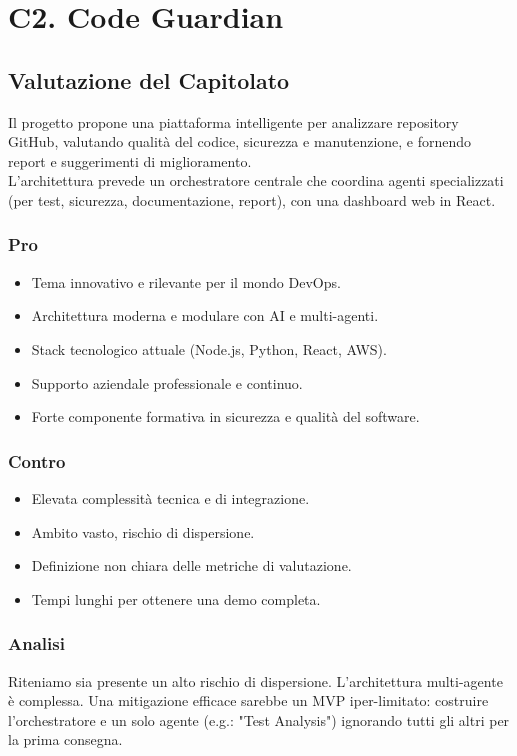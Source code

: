 \documentclass[a4paper, 11pt, oneside]{scrartcl} %
\begin{document}
\section{C2. Code Guardian}
\subsection*{Valutazione del Capitolato}
Il progetto propone una piattaforma intelligente per analizzare repository GitHub, valutando qualità del codice, sicurezza e manutenzione, e fornendo report e suggerimenti di miglioramento.\\
L’architettura prevede un orchestratore centrale che coordina agenti specializzati (per test, sicurezza, documentazione, report), con una dashboard web in React.

\subsubsection*{Pro}
\begin{itemize}
    \item Tema innovativo e rilevante per il mondo DevOps.
    \item Architettura moderna e modulare con AI e multi-agenti.
    \item Stack tecnologico attuale (Node.js, Python, React, AWS).
    \item Supporto aziendale professionale e continuo.
    \item Forte componente formativa in sicurezza e qualità del software.
\end{itemize}

\subsubsection*{Contro}
\begin{itemize}
    \item Elevata complessità tecnica e di integrazione.
    \item Ambito vasto, rischio di dispersione.
    \item Definizione non chiara delle metriche di valutazione.
    \item Tempi lunghi per ottenere una demo completa.
\end{itemize}
\subsubsection*{Analisi}
Riteniamo sia presente un alto rischio di dispersione. L'architettura multi-agente è complessa. Una mitigazione efficace sarebbe un MVP iper-limitato: costruire l'orchestratore e un solo agente (e.g.: "Test Analysis") ignorando tutti gli altri per la prima consegna.
\end{document}
